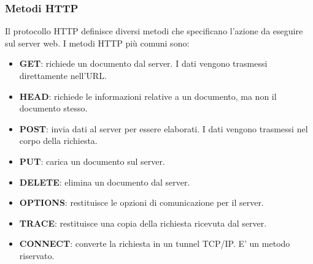 \documentclass[12pt]{report}
\begin{document}
	\subsubsection{Metodi HTTP}
	Il protocollo HTTP definisce diversi metodi che specificano l'azione da eseguire sul server web. I metodi HTTP più comuni sono:
	\begin{itemize}
		\item \textbf{GET}: richiede un documento dal server. I dati vengono trasmessi direttamente nell'URL.
		\item \textbf{HEAD}: richiede le informazioni relative a un documento, ma non il documento stesso.
		\item \textbf{POST}: invia dati al server per essere elaborati. I dati vengono trasmessi nel corpo della richiesta.
		\item \textbf{PUT}: carica un documento sul server.
		\item \textbf{DELETE}: elimina un documento dal server.
		\item \textbf{OPTIONS}: restituisce le opzioni di comunicazione per il server.
		\item \textbf{TRACE}: restituisce una copia della richiesta ricevuta dal server.
		\item \textbf{CONNECT}: converte la richiesta in un tunnel TCP/IP. E' un metodo riservato.
	\end{itemize}
\end{document}
